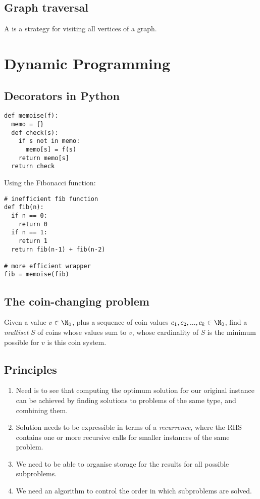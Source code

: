 \documentclass{article}
\begin{document}
\subsection{Graph traversal}

\begin{definition}
	A  is a strategy for visiting all vertices of a graph.
\end{definition} 

\section{Dynamic Programming}

\subsection{Decorators in Python}

\begin{verbatim}
def memoise(f):
  memo = {}
  def check(s):
    if s not in memo:
      memo[s] = f(s)
    return memo[s]
  return check
\end{verbatim}
\begin{example}
Using the Fibonacci function:
\begin{verbatim}
# inefficient fib function
def fib(n):
  if n == 0:
    return 0
  if n == 1:
    return 1
  return fib(n-1) + fib(n-2)

# more efficient wrapper
fib = memoise(fib)
\end{verbatim}
\end{example}

\subsection{The coin-changing problem}

\begin{definition}
	Given a value $v\in\N_0$, plus a sequence of coin values $c_1,c_2,...,c_k\in\N_0$,
	find a \emph{multiset} $S$ of coins whose values sum to $v$, whose cardinality
	of $S$ is the minimum possible for $v$ is this coin system.
\end{definition}

\subsection{Principles}

\begin{enumerate}
	\item Need is to see that computing the optimum solution for our original instance
		  can be achieved by finding solutions to problems of the same type, and combining
		  them.
    \item Solution needs to be expressible in terms of a \emph{recurrence}, where the RHS
		  contains one or more recursive calls for smaller instances of the same problem.
    \item We need to be able to organise storage for the results for all possible subproblems.
    \item We need an algorithm to control the order in which subproblems are solved.
\end{enumerate}
\end{document}
